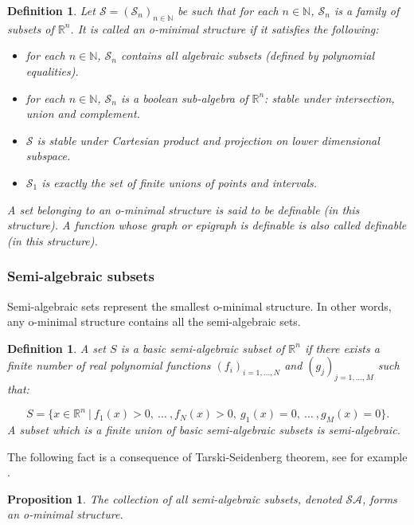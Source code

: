 \documentclass[11pt]{article}
\newcommand{\N}{\mathbb N}
\newcommand{\R}{\mathbb R}
\newcommand{\1}{\mathbbm{1}}
\newtheorem{defn}[lem]{Definition}
\newtheorem{prop}[lem]{Proposition}
\numberwithin{equation}{section}
\begin{document}
\begin{defn}
	Let $\mathcal{S}=(\mathcal{S}_{n})_{n\in \mathbb{N}}$ be such that for each $n \in \N$, $\mathcal{S}_{n}$ is a family of subsets of $\mathbb{R}^{n}$. It is called an \emph{o-minimal structure} if it satisfies the following:
	\begin{itemize}
    \itemsep0em 
		\item for each $n \in \N$, $\mathcal{S}_n$ contains all algebraic subsets (defined by polynomial equalities).
		\item for each $n \in \N$, $\mathcal{S}_n$ is a boolean sub-algebra of $\R^n$: stable under intersection, union and complement.
		\item $\mathcal{S}$ is stable under Cartesian product and projection on lower dimensional subspace.
		\item $\mathcal{S}_{1}$ is exactly the set of finite unions of points and intervals.
	\end{itemize}
	 A set belonging to an o-minimal structure is said to be definable (in this structure). A function whose graph or epigraph is definable is also called definable (in this structure).
\end{defn}

\subsubsection{Semi-algebraic subsets}
Semi-algebraic sets represent the smallest o-minimal structure. In other words, any o-minimal structure contains all the semi-algebraic sets.

\begin{defn}\label{semi_algebraic}
A set $S$ is a basic semi-algebraic subset of $\mathbb{R}^{n}$ if there exists a finite number of real polynomial functions $(f_{i})_{i=1,\ldots,N}$ and $(g_{j})_{j=1,\ldots,M}$ such that:

\begin{equation*}
    S=\{x\in \mathbb{R}^{n}\:|\:f_{1}(x)> 0,\:\ldots\:,f_{N}(x)>0,\: g_{1}(x)=0,\:\ldots\:,g_{M}(x)=0\}.
\end{equation*}
A subset which is a finite union of basic semi-algebraic subsets is semi-algebraic.
\end{defn}
The following fact is a consequence of Tarski-Seidenberg theorem, see for example \cite{coste2000introduction}.
\begin{prop}
    The collection of all semi-algebraic subsets, denoted $\mathcal{SA}$, forms an o-minimal structure. 
\end{prop}
\end{document}
